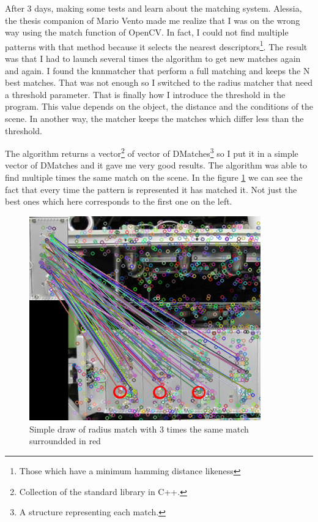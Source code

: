 	\par After 3 days, making some tests and learn about the matching system. Alessia, the thesis companion of Mario Vento made me realize that I was on the wrong way using the match function of OpenCV. In fact, I could not find multiple patterns with that method because it selects the nearest descriptors\footnote{Those which have a minimum hamming distance likeness}. The result was that I had to launch several times the algorithm to get new matches again and again. I found the knnmatcher that perform a full matching and keeps the N best matches. That was not enough so I switched to the radius matcher that need a threshold parameter. That is finally how I introduce the threshold in the program. This value depends on the object, the distance and the conditions of the scene. In another way, the matcher keeps the matches which differ less than the threshold.
	\par The algorithm returns a vector\footnote{Collection of the standard library in C++.} of vector of DMatches\footnote{A structure representing each match.} so I put it in a simple vector of DMatches and it gave me very good results. The algorithm was able to find multiple times the same match on the scene. In the figure \ref{matches} we can see the fact that every time the pattern is represented it has matched it. Not just the best ones which here corresponds to the first one on the left.
	
	
	\begin{figure}[h]
		\begin{center}
			\includegraphics[width=10cm]{images_not_compressed/matches.jpg}
			\caption{Simple draw of radius match with 3 times the same match surroundded in red}
			\label{matches}	
		\end{center}
	\end{figure}
	
